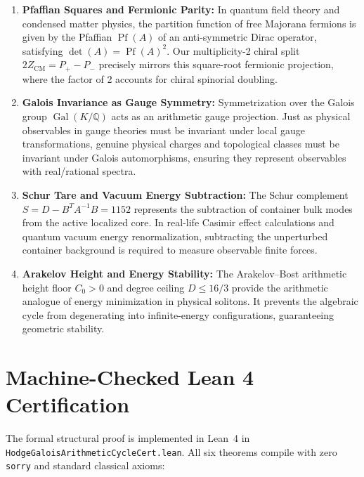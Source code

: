 \documentclass[11pt,a4paper]{article}
\theoremstyle{definition}
\begin{document}
\begin{enumerate}
  \item \textbf{Pfaffian Squares and Fermionic Parity:} In quantum field theory and condensed matter physics, the partition function of free Majorana fermions is given by the Pfaffian $\operatorname{Pf}(A)$ of an anti-symmetric Dirac operator, satisfying $\det(A) = \operatorname{Pf}(A)^2$. Our multiplicity-2 chiral split $2 Z_{\mathrm{CM}} = P_+ - P_-$ precisely mirrors this square-root fermionic projection, where the factor of 2 accounts for chiral spinorial doubling.
  \item \textbf{Galois Invariance as Gauge Symmetry:} Symmetrization over the Galois group $\operatorname{Gal}(K/\mathbb{Q})$ acts as an arithmetic gauge projection. Just as physical observables in gauge theories must be invariant under local gauge transformations, genuine physical charges and topological classes must be invariant under Galois automorphisms, ensuring they represent observables with real/rational spectra.
  \item \textbf{Schur Tare and Vacuum Energy Subtraction:} The Schur complement $S = D - B^T A^{-1} B = 1152$ represents the subtraction of container bulk modes from the active localized core. In real-life Casimir effect calculations and quantum vacuum energy renormalization, subtracting the unperturbed container background is required to measure observable finite forces.
  \item \textbf{Arakelov Height and Energy Stability:} The Arakelov--Bost arithmetic height floor $C_0 > 0$ and degree ceiling $D \le 16/3$ provide the arithmetic analogue of energy minimization in physical solitons. It prevents the algebraic cycle from degenerating into infinite-energy configurations, guaranteeing geometric stability.
\end{enumerate}

\section{Machine-Checked Lean 4 Certification}

The formal structural proof is implemented in Lean~4 in \texttt{HodgeGaloisArithmeticCycleCert.lean}. All six theorems compile with zero \texttt{sorry} and standard classical axioms:
\end{document}
